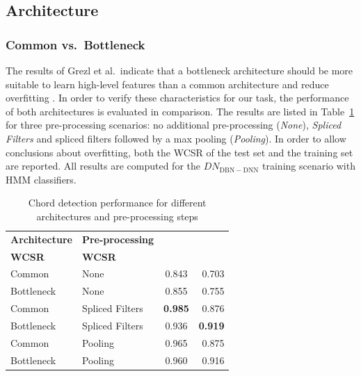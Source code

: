 \documentclass{article}
\begin{document}
\subsection{Architecture}
\subsubsection{Common vs.\ Bottleneck}
The results of Grezl et al.\ indicate that a bottleneck architecture should be more suitable to learn high-level features than a common architecture and reduce overfitting \cite{grezl2007probabilistic}. In order to verify these characteristics for our task, the performance of both architectures is evaluated in comparison. The results are listed in Table~\ref{tab:arch} for three pre-processing scenarios: no additional pre-processing (\textit{None}), \textit{Spliced Filters} and spliced filters followed by a max pooling (\textit{Pooling}). In order to allow conclusions about overfitting, both the WCSR of the test set and the training set are reported.
All results are computed for the $DN_\mathrm{DBN-DNN}$ training scenario with HMM classifiers.

\begin{table}
\centering
\begin{tabular*}{\columnwidth}{@{\extracolsep{\fill}}llcr}
\toprule
\textbf{Architecture}                   & \textbf{Pre-processing}                      & \begin{tabular}[c]{@{}c@{}}\textbf{Training}\\ \textbf{WCSR}\end{tabular} & \textbf{WCSR}  \\ \midrule
Common                         & None                                & 0.843                                                      & 0.703 \\
Bottleneck                     & None                                & 0.855                                                      & 0.755 \\
Common     & Spliced Filters & \textbf{0.985} & 0.876 \\
Bottleneck & Spliced Filters & 0.936 & \textbf{0.919} \\ 
Common & Pooling & 0.965 & 0.875 \\ 
Bottleneck & Pooling & 0.960 & 0.916 \\ \bottomrule
\end{tabular*}
\caption{Chord detection performance for different architectures and pre-processing steps}
\label{tab:arch}
\end{table}
\end{document}
